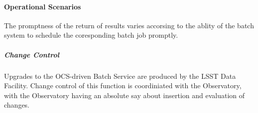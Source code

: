 \paragraph{Operational Scenarios}

The promptness of the return of results varies accorsing to the ablity
of the batch system to schedule the coresponding batch job promptly.

\subparagraph{Change Control}

Upgrades to the OCS-driven Batch Service are produced by the LSST Data Facility. Change control 
of this function is coordiniated with the Observatory, with the Observatory having an absolute say
about insertion and evaluation of changes.

